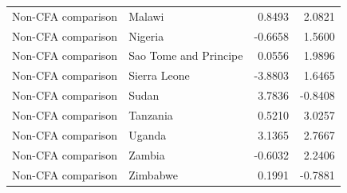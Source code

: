 \begin{table}
\begin{tabular}[t]{llrr}
Non-CFA comparison & Malawi & 0.8493 & 2.0821\\
Non-CFA comparison & Nigeria & -0.6658 & 1.5600\\
Non-CFA comparison & Sao Tome and Principe & 0.0556 & 1.9896\\
Non-CFA comparison & Sierra Leone & -3.8803 & 1.6465\\
\addlinespace
Non-CFA comparison & Sudan & 3.7836 & -0.8408\\
Non-CFA comparison & Tanzania & 0.5210 & 3.0257\\
Non-CFA comparison & Uganda & 3.1365 & 2.7667\\
Non-CFA comparison & Zambia & -0.6032 & 2.2406\\
Non-CFA comparison & Zimbabwe & 0.1991 & -0.7881\\
\bottomrule
\end{tabular}
\end{table}
